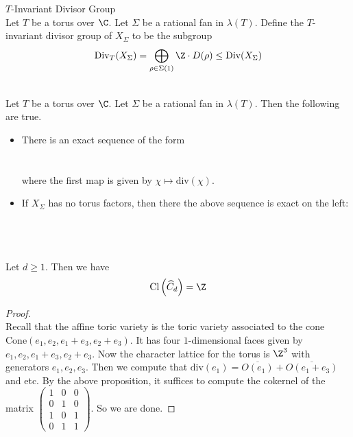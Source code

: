 \documentclass[a4paper]{article}
\begin{document}
\begin{defn}{$T$-Invariant Divisor Group}{}\\
Let $T$ be a torus over $\C$. Let $\Sigma$ be a rational fan in $\lambda(T)$. Define the $T$-invariant divisor group of $X_\Sigma$ to be the subgroup $$\text{Div}_T(X_\Sigma)=\bigoplus_{\rho\in\Sigma(1)}\Z\cdot D(\rho)\leq\text{Div}(X_\Sigma)$$
\end{defn}

\begin{prp}{}{}\\
Let $T$ be a torus over $\C$. Let $\Sigma$ be a rational fan in $\lambda(T)$. Then the following are true. 
\begin{itemize}
\item There is an exact sequence of the form \\~\\
\\
where the first map is given by $\chi\mapsto\text{div}(\chi)$. 
\item If $X_\Sigma$ has no torus factors, then there the above sequence is exact on the left: \\~\\
\\
\end{itemize}
\end{prp}

\begin{eg}{}{}\\
Let $d\geq 1$. Then we have $$\text{Cl}\left(\widehat{C}_d\right)=\Z$$
\begin{proof}\\
Recall that the affine toric variety is the toric variety associated to the cone $\text{Cone}(e_1,e_2,e_1+e_3,e_2+e_3)$. It has four $1$-dimensional faces given by $e_1,e_2,e_1+e_3,e_2+e_3$. Now the character lattice for the torus is $\Z^3$ with generators $e_1,e_2,e_3$. Then we compute that $\text{div}(e_1)=\overline{O(e_1)}+\overline{O(e_1+e_3)}$ and etc. By the above proposition, it suffices to compute the cokernel of the matrix $\begin{pmatrix}
1 & 0 & 0\\
0 & 1 & 0\\
1 & 0 & 1\\
0 & 1 & 1
\end{pmatrix}$. So we are done. 
\end{proof}
\end{eg}
\end{document}
